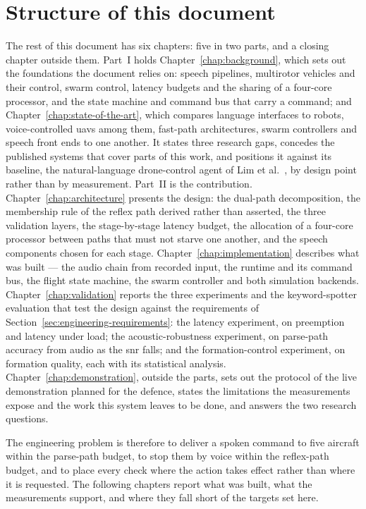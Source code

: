 \section{Structure of this document}
\label{sec:structure}
The rest of this document has six chapters: five in two parts, and a closing chapter outside
them. Part~I holds Chapter~\ref{chap:background}, which sets out the foundations the document relies
on: speech pipelines, multirotor vehicles and their control, swarm control, latency budgets and the
sharing of a four-core processor, and the state machine and command bus that carry a command; and
Chapter~\ref{chap:state-of-the-art}, which compares language interfaces to robots, voice-controlled
\glspl{uav} among them, fast-path architectures, swarm controllers and speech front ends to one
another. It states three
research gaps, concedes the published systems that cover parts of this work, and positions it
against its baseline, the natural-language drone-control agent of Lim et al.~\cite{lim2025}, by
design point rather than by measurement. Part~II is the contribution.
Chapter~\ref{chap:architecture} presents the design: the dual-path decomposition, the membership
rule of the reflex path derived rather than asserted, the three validation layers, the stage-by-stage
latency budget, the allocation of a four-core processor between paths that must not starve one
another, and the speech components chosen for each stage. Chapter~\ref{chap:implementation}
describes what was built --- the audio chain from recorded input, the runtime and its command bus,
the flight state machine, the swarm controller and both simulation backends.
Chapter~\ref{chap:validation} reports the three experiments and the keyword-spotter evaluation that
test the design against the requirements of Section~\ref{sec:engineering-requirements}: the latency
experiment, on preemption and latency under load; the acoustic-robustness experiment, on parse-path
accuracy from audio as the \gls{snr} falls; and the formation-control experiment, on formation
quality, each with its statistical analysis. Chapter~\ref{chap:demonstration}, outside the parts,
sets out the protocol of the live demonstration planned for the defence, states the limitations the
measurements expose and the work this system leaves to be done, and answers the two research
questions.

The engineering problem is therefore to deliver a spoken command to five aircraft within the
parse-path budget, to stop them by voice within the reflex-path budget, and to place every check
where the action takes effect rather than where it is requested. The following chapters report
what was built, what the measurements support, and where they fall short of the targets set here.
